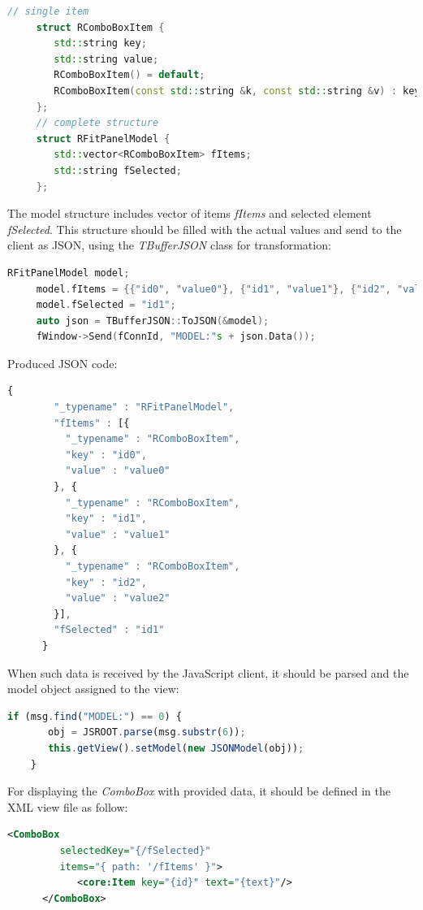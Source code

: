 \documentclass[a4paper]{jpconf}
\begin{document}
\begin{lstlisting}[language=C++,numbers=none]
     // single item
     struct RComboBoxItem {
        std::string key;
        std::string value;
        RComboBoxItem() = default;
        RComboBoxItem(const std::string &k, const std::string &v) : key(k), value(v) {}
     };
     // complete structure
     struct RFitPanelModel {
        std::vector<RComboBoxItem> fItems;
        std::string fSelected;
     };
\end{lstlisting}

The model structure includes vector of items \textit{fItems} and selected element \textit{fSelected}.
This structure should be filled with the actual values and send to the client as JSON, using the \textit{TBufferJSON} class for transformation:

\begin{lstlisting}[language=C++,numbers=none]
     RFitPanelModel model;
     model.fItems = {{"id0", "value0"}, {"id1", "value1"}, {"id2", "value2"}};
     model.fSelected = "id1";
     auto json = TBufferJSON::ToJSON(&model);
     fWindow->Send(fConnId, "MODEL:"s + json.Data());
\end{lstlisting}

Produced JSON code:

\begin{lstlisting}[language=JavaScript,numbers=none]
      {
        "_typename" : "RFitPanelModel",
        "fItems" : [{
          "_typename" : "RComboBoxItem",
          "key" : "id0",
          "value" : "value0"
        }, {
          "_typename" : "RComboBoxItem",
          "key" : "id1",
          "value" : "value1"
        }, {
          "_typename" : "RComboBoxItem",
          "key" : "id2",
          "value" : "value2"
        }],
        "fSelected" : "id1"
      }
\end{lstlisting}

When such data is received by the JavaScript client, it should be parsed and the model object assigned to the view:

\begin{lstlisting}[language=JavaScript,numbers=none]
    if (msg.find("MODEL:") == 0) {
       obj = JSROOT.parse(msg.substr(6));
       this.getView().setModel(new JSONModel(obj));
    }
\end{lstlisting}

For displaying the \textit{ComboBox} with provided data, it should be defined in the XML view file as follow:

\begin{lstlisting}[language=XML,numbers=none]
      <ComboBox
         selectedKey="{/fSelected}"
         items="{ path: '/fItems' }">
            <core:Item key="{id}" text="{text}"/>
      </ComboBox>
\end{lstlisting}
\end{document}
